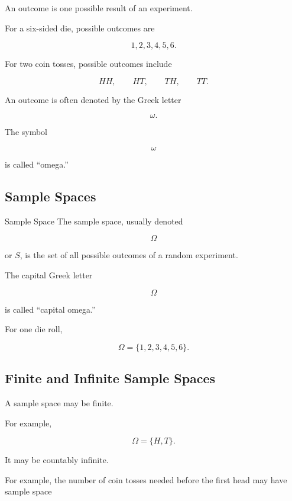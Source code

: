 An outcome is one possible result of an experiment.

For a six-sided die, possible outcomes are

\[
1,2,3,4,5,6.
\]

For two coin tosses, possible outcomes include

\[
HH,
\qquad
HT,
\qquad
TH,
\qquad
TT.
\]

An outcome is often denoted by the Greek letter

\[
\omega.
\]

The symbol

\[
\omega
\]

is called ``omega.''

\subsection{Sample Spaces}
\label{subsec:sample-spaces}

\begin{definitionbox}{Sample Space}
The sample space, usually denoted

\[
\boxed{
\Omega
}
\]

or \(S\), is the set of all possible outcomes of a random experiment.
\end{definitionbox}

The capital Greek letter

\[
\Omega
\]

is called ``capital omega.''

For one die roll,

\[
\boxed{
\Omega
=
\{1,2,3,4,5,6\}.
}
\]

\subsection{Finite and Infinite Sample Spaces}
\label{subsec:finite-infinite-sample-spaces}

A sample space may be finite.

For example,

\[
\Omega
=
\{H,T\}.
\]

It may be countably infinite.

For example, the number of coin tosses needed before the first head may
have sample space

